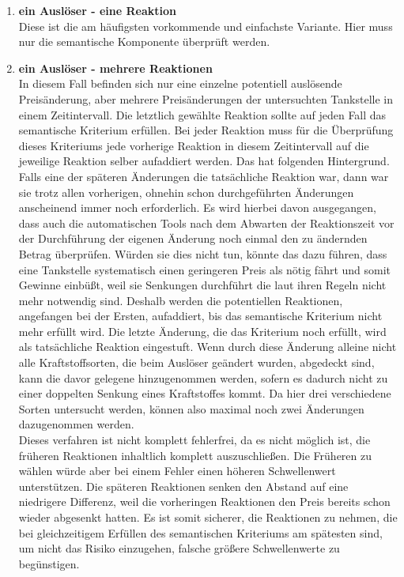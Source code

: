 \begin{enumerate}
\item \textbf{ein Auslöser - eine Reaktion}\\
Diese ist die am häufigsten vorkommende und einfachste Variante. Hier muss nur die semantische Komponente überprüft werden. 
\item \textbf{ein Auslöser - mehrere Reaktionen}\\

In diesem Fall befinden sich nur eine einzelne potentiell auslösende Preisänderung, aber mehrere Preisänderungen der untersuchten Tankstelle in einem Zeitintervall. Die letztlich gewählte Reaktion sollte auf jeden Fall das semantische Kriterium erfüllen. Bei jeder Reaktion muss für die Überprüfung dieses Kriteriums jede vorherige Reaktion in diesem Zeitintervall auf die jeweilige Reaktion selber aufaddiert werden. Das hat folgenden Hintergrund. Falls eine der späteren Änderungen die tatsächliche Reaktion war, dann war sie trotz allen vorherigen, ohnehin schon durchgeführten Änderungen anscheinend immer noch erforderlich. Es wird hierbei davon ausgegangen, dass auch die automatischen Tools nach dem Abwarten der Reaktionszeit vor der Durchführung der eigenen Änderung noch einmal den zu ändernden Betrag überprüfen. Würden sie dies nicht tun, könnte das dazu führen, dass eine Tankstelle systematisch einen geringeren Preis als nötig fährt und somit Gewinne einbüßt, weil sie Senkungen durchführt die laut ihren Regeln nicht mehr notwendig sind. Deshalb werden die potentiellen Reaktionen, angefangen bei der Ersten, aufaddiert, bis das semantische Kriterium nicht mehr erfüllt wird. Die letzte Änderung, die das Kriterium noch erfüllt, wird als tatsächliche Reaktion eingestuft. Wenn durch diese Änderung alleine nicht alle Kraftstoffsorten, die beim Auslöser geändert wurden, abgedeckt sind, kann die davor gelegene hinzugenommen werden, sofern es dadurch nicht zu einer doppelten Senkung eines Kraftstoffes kommt. Da hier drei verschiedene Sorten untersucht werden, können also maximal noch zwei Änderungen dazugenommen werden.\\
Dieses verfahren ist nicht komplett fehlerfrei, da es nicht möglich ist, die früheren Reaktionen inhaltlich komplett auszuschließen. Die Früheren zu wählen würde aber bei einem Fehler einen höheren Schwellenwert unterstützen. Die späteren Reaktionen senken den Abstand auf eine niedrigere Differenz, weil die vorheringen Reaktionen den Preis bereits schon wieder abgesenkt hatten. Es ist somit sicherer, die Reaktionen zu nehmen, die bei gleichzeitigem Erfüllen des semantischen Kriteriums am spätesten sind, um nicht das Risiko einzugehen, falsche größere Schwellenwerte zu begünstigen.\\

\end{enumerate}
